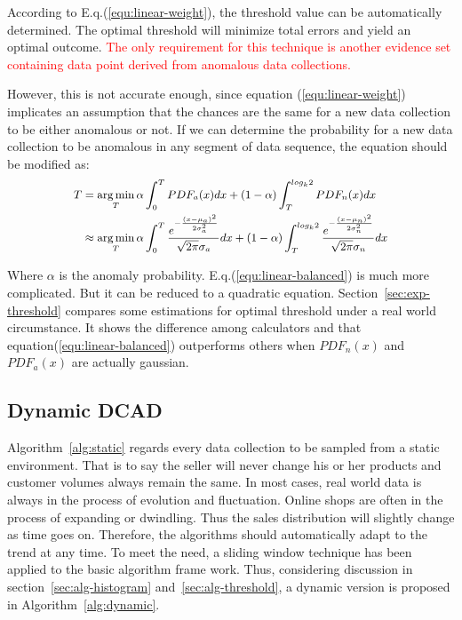 \documentclass[10pt,conference,letterpaper]{IEEEtran}
\begin{document}
			According to E.q.(\ref{equ:linear-weight}), the threshold value can be automatically determined. The optimal threshold will minimize total errors and yield an optimal outcome. \textcolor{red}{The only requirement for this technique is another evidence set containing data point derived from anomalous data collections.}
			
			However, this is not accurate enough, since equation (\ref{equ:linear-weight}) implicates an assumption that the chances are the same for a new data collection to be either anomalous or not. If we can determine the probability for a new data collection to be anomalous in any segment of data sequence, the equation should be modified as:
			\begin{equation}\label{equ:linear-balanced}
				{\footnotesize
				\begin{split}
					T & = \mathop{\arg\min}_{T} \alpha\int_{0}^{T}PDF_{a}(x)dx +
					(1-\alpha)\int_{T}^{log_k2}PDF_{n}(x)dx\\
					& \approx \mathop{\arg\min}_{T}
					\alpha\int_{0}^{T}
					\frac{e^{-\frac{(x - \mu_a)^2}{2\sigma_a^2}}}{\sqrt{2\pi} \sigma_a}dx
					+ 
					(1-\alpha)\int_{T}^{log_k2}
					\frac{e^{-\frac{(x - \mu_n)^2}{2\sigma_n^2}}}{\sqrt{2\pi} \sigma_n}dx
				\end{split}}
			\end{equation}
	
			Where $\alpha$ is the anomaly probability. E.q.(\ref{equ:linear-balanced}) is much more complicated. But it can be reduced to a quadratic equation.
			Section~\ref{sec:exp-threshold} compares some estimations for optimal threshold under a real world circumstance. It shows the difference among calculators and that equation(\ref{equ:linear-balanced}) outperforms others when $PDF_n(x)$ and $PDF_a(x)$ are actually gaussian.
	
		\subsection{Dynamic DCAD}\label{sec:alg-dynamic}
Algorithm~\ref{alg:static} regards every data collection to be sampled from a static environment. That is to say the seller will never change his or her products and customer volumes always remain the same. In most cases, real world data is always in the process of evolution and fluctuation. Online shops are often in the process of expanding or dwindling. Thus the sales distribution will slightly change as time goes on. Therefore, the algorithms should automatically adapt to the trend at any time. To meet the need, a sliding window technique has been applied to the basic algorithm frame work. Thus, considering discussion in section~\ref{sec:alg-histogram} and~\ref{sec:alg-threshold}, a dynamic version is proposed in Algorithm~\ref{alg:dynamic}.
	
\end{document}
